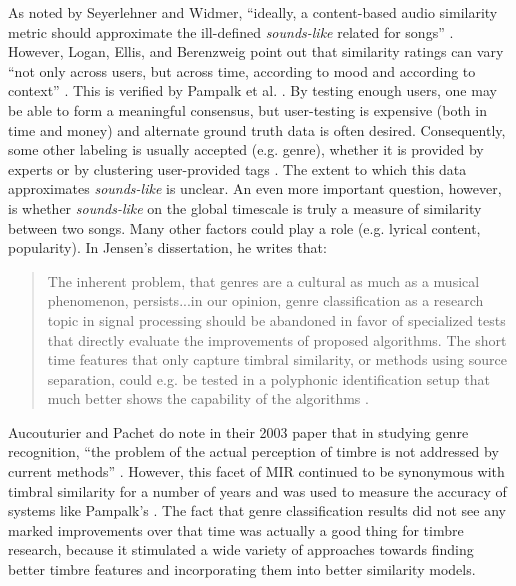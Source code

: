 \documentclass[12pt]{report} 	%
\numberwithin{figure}{chapter}
\numberwithin{table}{chapter}
\numberwithin{equation}{chapter}
\begin{document}
\begin{flushleft}
As noted by Seyerlehner and Widmer, ``ideally, a content-based audio similarity metric should approximate the ill-defined \textit{sounds-like} related for songs'' \cite[p. 1]{Seyerlehner:2008tw}. However, Logan, Ellis, and Berenzweig point out that similarity ratings can vary ``not only across users, but across time, according to mood and according to context'' \cite[p. 1]{Logan:2003cr}. This is verified by Pampalk et al. \cite[p. 6]{Pampalk:2008xz}. By testing enough users, one may be able to form a meaningful consensus, but user-testing is expensive (both in time and money) and alternate ground truth data is often desired. Consequently, some other labeling is usually accepted (e.g. genre), whether it is provided by experts or by clustering user-provided tags \cite[p. 2]{Logan:2003cr}. The extent to which this data approximates \textit{sounds-like} is unclear. An even more important question, however, is whether \textit{sounds-like} on the global timescale is truly a measure of similarity between two songs. Many other factors could play a role (e.g. lyrical content, popularity). In Jensen's dissertation, he writes that:
\begin{singlespace}
\selectfont
\begin{quote} The inherent problem, that genres are a cultural as much as a musical phenomenon, persists...in our opinion, genre classification as a research topic in signal processing should be abandoned in favor of specialized tests that directly evaluate the improvements of proposed algorithms. The short time features that only capture timbral similarity, or methods using source separation, could e.g. be tested in a polyphonic identification setup that much better shows the capability of the algorithms \cite[p. 11]{Jensen:2009ta}.
\end{quote}
\selectfont
\end{singlespace}
Aucouturier and Pachet do note in their 2003 paper that in studying genre recognition, ``the problem of the actual perception of timbre is not addressed by current methods'' \cite[p. 16]{Aucouturier:2003gs}. However, this facet of MIR continued to be synonymous with timbral similarity for a number of years and was used to measure the accuracy of systems like Pampalk's \cite{Pampalk:2006pr}. The fact that genre classification results did not see any marked improvements over that time was actually a good thing for timbre research, because it stimulated a wide variety of approaches towards finding better timbre features and incorporating them into better similarity models.


\end{flushleft}
\end{document}
